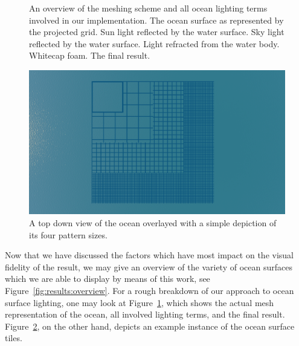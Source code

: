 \begin{figure}
{		\label{fig:results:whitecaps}
	}
	\hfill
	\caption[An overview of the meshing scheme and all ocean lighting terms involved
	in our implementation.]{
		An overview of the meshing scheme and all ocean lighting terms involved in our
		implementation.
		 The ocean surface as represented by the projected grid.
		 Sun light reflected by the water surface.
		 Sky light reflected by the water surface.
		 Light refracted from the water body.
		 Whitecap foam.
		 The final result.
	}
	\label{fig:results:lighting}
\end{figure}
%
%
\begin{figure}
	\centering
	\includegraphics[width=\textwidth]{figures/19-06-2018_17-10-50_tiles.png}
	\caption[Depiction of ocean surface tiles.]{A top down view of the ocean
		overlayed with a simple depiction of its four pattern sizes.}
	\label{fig:results:tiling}
\end{figure}
%
%

Now that we have discussed the factors which have most impact on the visual
fidelity of the result, we may give an overview of the variety of
ocean surfaces which we are able to display by means of this work, see
Figure~\ref{fig:results:overview}.
For a rough breakdown of our approach to ocean surface lighting,
one may look at Figure~\ref{fig:results:lighting},
which shows the actual mesh representation of the ocean, all involved
lighting terms, and the final result.
Figure~\ref{fig:results:tiling}, on the other hand, depicts an example
instance of the ocean surface tiles. 

